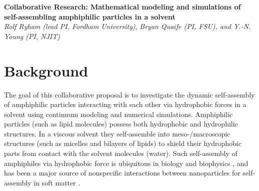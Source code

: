 
\noindent
{\bf Collaborative Research: Mathematical modeling and simulations of
self-assembling amphiphilic particles in a solvent} \\
{\it Rolf Ryham (lead PI, Fordham University)}, {\it Bryan Quaife (PI,
FSU), and Y.-N. Young (PI, NJIT)}
\section{Background}
\label{sec:background}
The goal of this collaborative proposal is to investigate the dynamic self-assembly of amphiphilic particles interacting with each other via hydrophobic forces in a solvent using continuum
modeling and numerical simulations.  Amphiphilic particles (such as lipid molecules) possess both hydrophobic and hydrophilic structures. In a viscous solvent they
self-assemble into meso-/macroscopic structures (such as micelles and bilayers of lipids) to shield their hydrophobic parts from contact with the solvent molecules (water).
%
%
Such self-assembly of amphiphiles via hydrophobic force is ubiquitous in biology and biophysics \cite{Israelachvili1954},
and has been a major source of nonspecific interactions between
nanoparticles for self-assembly in  soft matter \cite{Sanchez-IglesiasEtAl2012_ACSNano,AltantzisEtAl2013_PSC,XieYangLuEtAl2020_COCIS}. 



